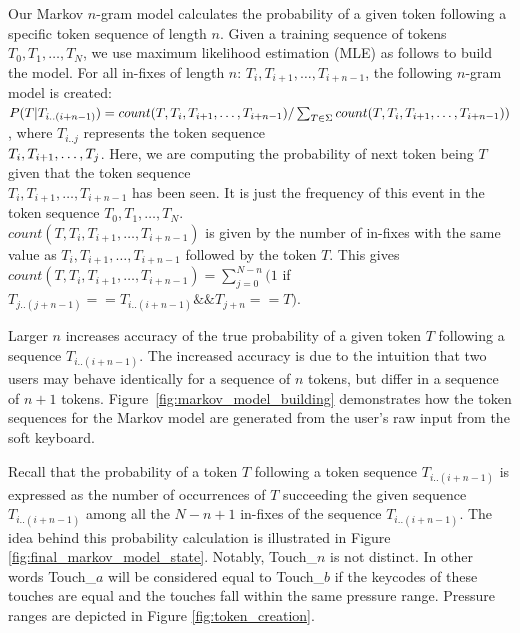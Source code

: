 \documentclass{acm_proc_article-sp}
\begin{document}
Our Markov $n$-gram model calculates the probability of a given token following a specific 
token sequence of length $n$.
Given a training sequence of tokens $T_0, T_1, \dots , T_N$,
we use maximum likelihood estimation (MLE) as follows to build the model.
For all in-fixes of
length $n$: $T_i, T_{i+1}, \dots , T_{i+n-1}$,
the following $n$-gram model is created:
$P(T | T_{i..(i+n-1)}) =  count(T, T_i, T_{i+1}, \dots , T_{i+n-1})/\sum_{T \in \Sigma} count(
T, T_i, T_{i+1}, \dots , \\T_{i+n-1}))$, where $T_{i..j}$ represents the
token sequence \\
$T_i, T_{i+\\1}, \dots, T_j$.
Here, we are computing the probability of next token being $T$
given that the token sequence \\
$T_i, T_{i+1}, \dots , T_{i+n-1}$ has been seen.
It is just the
frequency of this event in the token sequence $T_0, T_1, \dots , T_N$. \\
$count(T, T_i, T_{i+1}, \dots , T_{i+n-1})$ is given by the number of in-fixes with the same value as
$T_i, T_{i+1}, \dots , T_{i+n-1}$ followed by the token $T$. This gives 
$count(T, T_i, T_{i+1}, \dots , T_{i+n-1}) = \sum_{j=0}^{N-n}(1$ if $T_{j..(j+n-1)} == T_{i..(i+n-1)} \&\&
T_{j+n} == T)$.

Larger $n$ increases accuracy of the true probability of a given token $T$ following
a sequence $T_{i..(i+n-1)}$.
The increased accuracy is due to the intuition that 
two users may behave identically for a sequence of $n$ tokens, but
differ in a sequence of $n+1$ tokens.
Figure~\ref{fig:markov_model_building} demonstrates how the token sequences for the Markov model are generated from the user's raw input from the soft keyboard.

Recall that the probability of a token $T$ following  a token sequence $T_{i..(i+n-1)}$ is 
expressed as the number of occurrences of $T$ succeeding the given sequence $T_{i..(i+n-1)}$ among
all the $N-n+1$ in-fixes of the sequence $T_{i..(i+n-1)}$.
The idea behind this probability calculation is illustrated in Figure \ref{fig:final_markov_model_state}.
Notably, Touch\_$n$ is not distinct.
In other words Touch\_$a$ will be considered equal to Touch\_$b$ if the keycodes of these touches are equal and the touches fall within the same pressure range. Pressure ranges are depicted in Figure \ref{fig:token_creation}.
\end{document}

